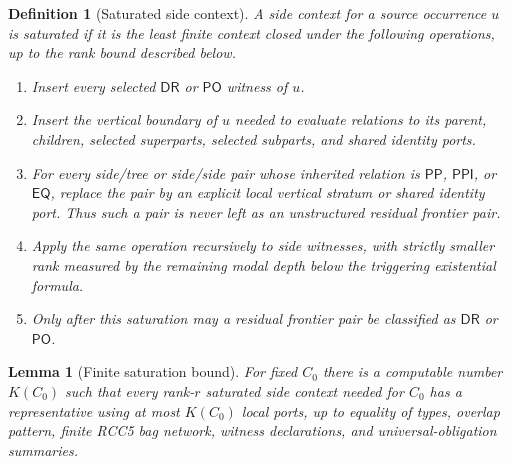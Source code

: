 \documentclass[11pt]{article}
\newtheorem{lemma}[theorem]{Lemma}
\newtheorem{definition}[theorem]{Definition}
\newcommand{\EQ}{\mathsf{EQ}}
\newcommand{\PP}{\mathsf{PP}}
\newcommand{\PPI}{\mathsf{PPI}}
\newcommand{\PO}{\mathsf{PO}}
\newcommand{\DR}{\mathsf{DR}}
\begin{document}
\begin{definition}[Saturated side context]
A side context for a source occurrence $u$ is saturated if it is the least finite context
closed under the following operations, up to the rank bound described below.
\begin{enumerate}[label=(S\arabic*)]
\item Insert every selected $\DR$ or $\PO$ witness of $u$.
\item Insert the vertical boundary of $u$ needed to evaluate relations to its parent,
children, selected superparts, selected subparts, and shared identity ports.
\item For every side/tree or side/side pair whose inherited relation is $\PP$, $\PPI$, or
$\EQ$, replace the pair by an explicit local vertical stratum or shared identity port.
Thus such a pair is never left as an unstructured residual frontier pair.
\item Apply the same operation recursively to side witnesses, with strictly smaller rank
measured by the remaining modal depth below the triggering existential formula.
\item Only after this saturation may a residual frontier pair be classified as $\DR$ or
$\PO$.
\end{enumerate}
\end{definition}

\begin{lemma}[Finite saturation bound]\label{lem:finite-saturation}
For fixed $C_0$ there is a computable number $K(C_0)$ such that every rank-$r$ saturated
side context needed for $C_0$ has a representative using at most $K(C_0)$ local ports,
up to equality of types, overlap pattern, finite RCC5 bag network, witness declarations,
and universal-obligation summaries.
\end{lemma}
\end{document}
